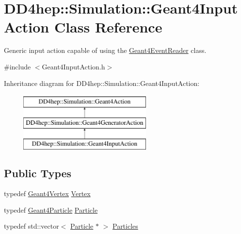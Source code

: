 \hypertarget{class_d_d4hep_1_1_simulation_1_1_geant4_input_action}{}\section{D\+D4hep\+:\+:Simulation\+:\+:Geant4\+Input\+Action Class Reference}
\label{class_d_d4hep_1_1_simulation_1_1_geant4_input_action}


Generic input action capable of using the \hyperlink{class_d_d4hep_1_1_simulation_1_1_geant4_event_reader}{Geant4\+Event\+Reader} class.  




{\ttfamily \#include $<$Geant4\+Input\+Action.\+h$>$}

Inheritance diagram for D\+D4hep\+:\+:Simulation\+:\+:Geant4\+Input\+Action\+:\begin{figure}[H]
\begin{center}
\leavevmode
\includegraphics[height=3.000000cm]{class_d_d4hep_1_1_simulation_1_1_geant4_input_action}
\end{center}
\end{figure}
\subsection*{Public Types}
\begin{DoxyCompactItemize}
\item 
typedef \hyperlink{class_d_d4hep_1_1_simulation_1_1_geant4_vertex}{Geant4\+Vertex} \hyperlink{class_d_d4hep_1_1_simulation_1_1_geant4_input_action_a0bcc23935dc55574b02d9ee4514eabc8}{Vertex}
\item 
typedef \hyperlink{class_d_d4hep_1_1_simulation_1_1_geant4_particle}{Geant4\+Particle} \hyperlink{class_d_d4hep_1_1_simulation_1_1_geant4_input_action_ab8d227297b50dec5cb769635da56deec}{Particle}
\item 
typedef std\+::vector$<$ \hyperlink{class_d_d4hep_1_1_simulation_1_1_geant4_input_action_ab8d227297b50dec5cb769635da56deec}{Particle} $\ast$ $>$ \hyperlink{class_d_d4hep_1_1_simulation_1_1_geant4_input_action_ae62b1f5e1be390991dd228e7bb7bcc04}{Particles}
\end{DoxyCompactItemize}
